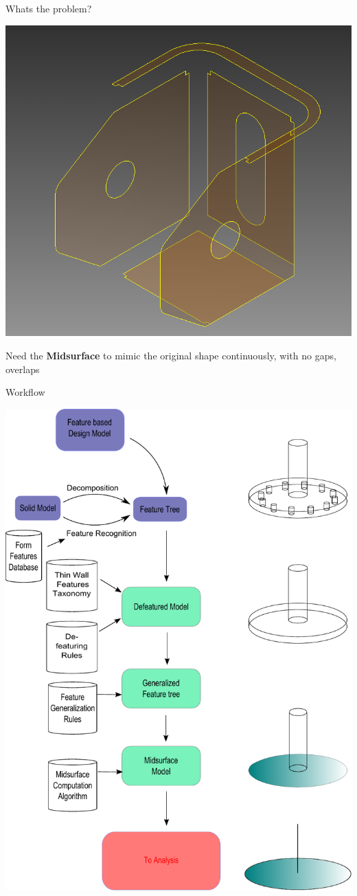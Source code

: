 \begin{frame}[t]
\begin{columns}[t]
\begin{column}{\twocolwid}
\begin{block}{Whats the problem?}
\begin{center}
\includegraphics[scale=0.6]{../Common/images/Inventor_Bracket_MidsBorders.png}
\end{center}
Need the \textbf{Midsurface} to mimic the original shape continuously, with no gaps, overlaps
\end{block}

\begin{block}{Workflow}
\begin{center}
\includegraphics[width=0.6\linewidth]{../Common/images/SystemArchitecture.pdf}
\end{center}
\end{block}
\end{column}


\end{columns}
\end{frame}
